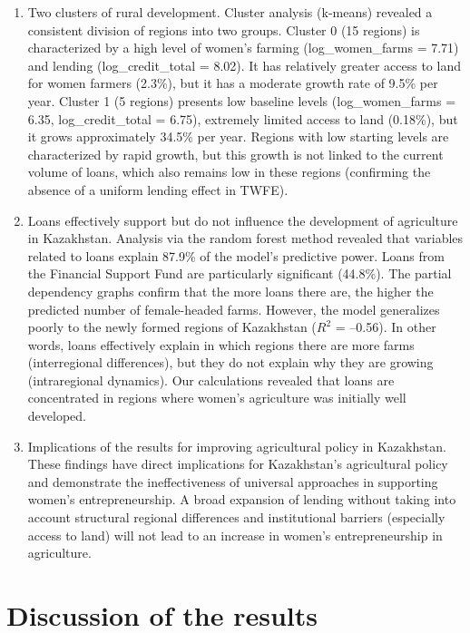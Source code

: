 ﻿\documentclass[pdflatex,sn-mathphys-ay]{sn-jnl}
\begin{document}
\begin{enumerate}
\item Two clusters of rural development.
Cluster analysis (k-means) revealed a consistent division of regions
into two groups. Cluster 0 (15 regions) is characterized by a high
level of women's farming (log\_women\_farms = 7.71) and lending
(log\_credit\_total = 8.02). It has relatively greater access to land
for women farmers (2.3\%), but it has a moderate growth rate of 9.5\%
per year. Cluster 1 (5 regions) presents low baseline levels
(log\_women\_farms = 6.35, log\_credit\_total = 6.75), extremely
limited access to land (0.18\%), but it grows approximately 34.5\% per
year. Regions with low starting levels are characterized by rapid
growth, but this growth is not linked to the current volume of loans,
which also remains low in these regions (confirming the absence of a
uniform lending effect in TWFE).

\item Loans effectively support but do not influence the development of
agriculture in Kazakhstan. Analysis via the random forest method
revealed that variables related to loans explain 87.9\% of the model's
predictive power. Loans from the Financial Support Fund are particularly
significant (44.8\%). The partial dependency graphs confirm that the
more loans there are, the higher the predicted number of female-headed
farms. However, the model generalizes poorly to the newly formed regions
of Kazakhstan ($R^2$ = --0.56). In other words, loans effectively explain
in which regions there are more farms (interregional differences), but
they do not explain why they are growing (intraregional dynamics). Our
calculations revealed that loans are concentrated in regions where
women's agriculture was initially well developed.

\item Implications of the results for improving agricultural policy in
Kazakhstan. These findings have direct implications for Kazakhstan's
agricultural policy and demonstrate the ineffectiveness of universal
approaches in supporting women's entrepreneurship. A broad expansion of
lending without taking into account structural regional differences and
institutional barriers (especially access to land) will not lead to an
increase in women's entrepreneurship in agriculture.
\end{enumerate}

\section{Discussion of the results}
\end{document}
